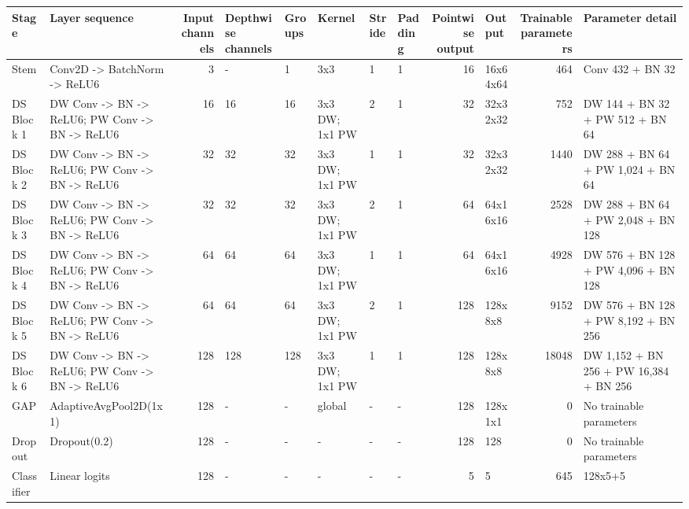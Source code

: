 \begin{tabular}{llrlllllrlrl}
\toprule
Stage & Layer sequence & Input channels & Depthwise channels & Groups & Kernel & Stride & Padding & Pointwise output & Output & Trainable parameters & Parameter detail \\
\midrule
Stem & Conv2D -> BatchNorm -> ReLU6 & 3 & - & 1 & 3x3 & 1 & 1 & 16 & 16x64x64 & 464 & Conv 432 + BN 32 \\
DS Block 1 & DW Conv -> BN -> ReLU6; PW Conv -> BN -> ReLU6 & 16 & 16 & 16 & 3x3 DW; 1x1 PW & 2 & 1 & 32 & 32x32x32 & 752 & DW 144 + BN 32 + PW 512 + BN 64 \\
DS Block 2 & DW Conv -> BN -> ReLU6; PW Conv -> BN -> ReLU6 & 32 & 32 & 32 & 3x3 DW; 1x1 PW & 1 & 1 & 32 & 32x32x32 & 1440 & DW 288 + BN 64 + PW 1,024 + BN 64 \\
DS Block 3 & DW Conv -> BN -> ReLU6; PW Conv -> BN -> ReLU6 & 32 & 32 & 32 & 3x3 DW; 1x1 PW & 2 & 1 & 64 & 64x16x16 & 2528 & DW 288 + BN 64 + PW 2,048 + BN 128 \\
DS Block 4 & DW Conv -> BN -> ReLU6; PW Conv -> BN -> ReLU6 & 64 & 64 & 64 & 3x3 DW; 1x1 PW & 1 & 1 & 64 & 64x16x16 & 4928 & DW 576 + BN 128 + PW 4,096 + BN 128 \\
DS Block 5 & DW Conv -> BN -> ReLU6; PW Conv -> BN -> ReLU6 & 64 & 64 & 64 & 3x3 DW; 1x1 PW & 2 & 1 & 128 & 128x8x8 & 9152 & DW 576 + BN 128 + PW 8,192 + BN 256 \\
DS Block 6 & DW Conv -> BN -> ReLU6; PW Conv -> BN -> ReLU6 & 128 & 128 & 128 & 3x3 DW; 1x1 PW & 1 & 1 & 128 & 128x8x8 & 18048 & DW 1,152 + BN 256 + PW 16,384 + BN 256 \\
GAP & AdaptiveAvgPool2D(1x1) & 128 & - & - & global & - & - & 128 & 128x1x1 & 0 & No trainable parameters \\
Dropout & Dropout(0.2) & 128 & - & - & - & - & - & 128 & 128 & 0 & No trainable parameters \\
Classifier & Linear logits & 128 & - & - & - & - & - & 5 & 5 & 645 & 128x5+5 \\
\bottomrule
\end{tabular}
